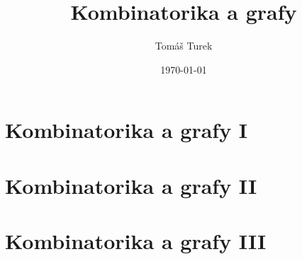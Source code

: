 \documentclass[12pt,a4paper]{report}
\title{Kombinatorika a grafy}
\author{Tomáš Turek}
\date{\today}
\begin{document}
	\maketitle
	\tableofcontents
	\part{Kombinatorika a grafy I}
	
	
	
	
	
	
	
	
	\part{Kombinatorika a grafy II}
	
	
	
	
	
	
	
	\part{Kombinatorika a grafy III}
	
	
	
	
\end{document}
